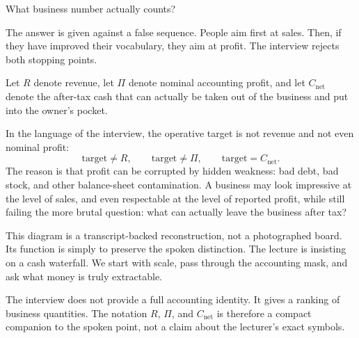 What business number actually counts?

The answer is given against a false sequence. People aim first at sales. Then, if they have improved their vocabulary, they aim at profit. The interview rejects both stopping points.

\begin{definition}
Let \(R\) denote revenue, let \(\Pi\) denote nominal accounting profit, and let \(C_{\text{net}}\) denote the after-tax cash that can actually be taken out of the business and put into the owner's pocket.
\end{definition}

In the language of the interview, the operative target is not revenue and not even nominal profit:
\begin{equation}
\text{target} \neq R, \qquad \text{target} \neq \Pi, \qquad \text{target} = C_{\text{net}}.
\end{equation}
The reason is that profit can be corrupted by hidden weakness: bad debt, bad stock, and other balance-sheet contamination. A business may look impressive at the level of sales, and even respectable at the level of reported profit, while still failing the more brutal question: what can actually leave the business after tax?

\begin{figure}
\centering
{}
\end{figure}

This diagram is a transcript-backed reconstruction, not a photographed board. Its function is simply to preserve the spoken distinction. The lecture is insisting on a cash waterfall. We start with scale, pass through the accounting mask, and ask what money is truly extractable.

\begin{remark}
The interview does not provide a full accounting identity. It gives a ranking of business quantities. The notation \(R\), \(\Pi\), and \(C_{\text{net}}\) is therefore a compact companion to the spoken point, not a claim about the lecturer's exact symbols.
\end{remark}


